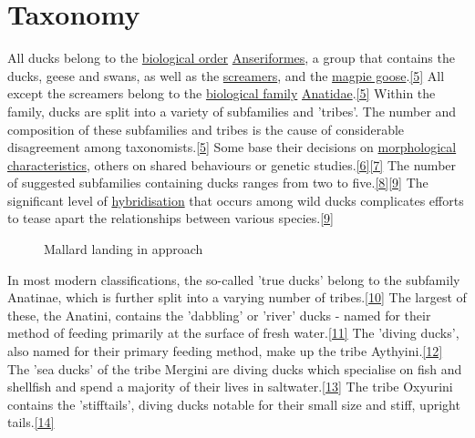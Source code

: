 \documentclass[11pt,a4paper]{article}
\begin{document}
\section{Taxonomy}

All ducks belong to the \href{/wiki/Order\_\%28biology\%29}{biological order} \href{/wiki/Anseriformes}{Anseriformes}, a group that contains the ducks, geese and swans, as well as the \href{/wiki/Screamer}{screamers}, and the \href{/wiki/Magpie\_goose}{magpie goose}.\href{\#cite\_note-FOOTNOTECarboneras1992536-5}{[5]} All except the screamers belong to the \href{/wiki/Family\_\%28biology\%29}{biological family} \href{/wiki/Anatidae}{Anatidae}.\href{\#cite\_note-FOOTNOTECarboneras1992536-5}{[5]} Within the family, ducks are split into a variety of subfamilies and 'tribes'. The number and composition of these subfamilies and tribes is the cause of considerable disagreement among taxonomists.\href{\#cite\_note-FOOTNOTECarboneras1992536-5}{[5]} Some base their decisions on \href{/wiki/Morphology\_\%28biology\%29}{morphological characteristics}, others on shared behaviours or genetic studies.\href{\#cite\_note-FOOTNOTELivezey1986737–738-6}{[6]}\href{\#cite\_note-FOOTNOTEMadsenMcHughde\_Kloet1988452-7}{[7]} The number of suggested subfamilies containing ducks ranges from two to five.\href{\#cite\_note-FOOTNOTEDonne-GousséLaudetHänni2002353–354-8}{[8]}\href{\#cite\_note-FOOTNOTECarboneras1992540-9}{[9]} The significant level of \href{/wiki/Hybrid\_\%28biology\%29}{hybridisation} that occurs among wild ducks complicates efforts to tease apart the relationships between various species.\href{\#cite\_note-FOOTNOTECarboneras1992540-9}{[9]}

\begin{figure}[h]
\caption{Mallard landing in approach}
\end{figure}

In most modern classifications, the so-called 'true ducks' belong to the subfamily Anatinae, which is further split into a varying number of tribes.\href{\#cite\_note-FOOTNOTEElphickDunningSibley2001191-10}{[10]} The largest of these, the Anatini, contains the 'dabbling' or 'river' ducks - named for their method of feeding primarily at the surface of fresh water.\href{\#cite\_note-FOOTNOTEKear2005448-11}{[11]} The 'diving ducks', also named for their primary feeding method, make up the tribe Aythyini.\href{\#cite\_note-FOOTNOTEKear2005622–623-12}{[12]} The 'sea ducks' of the tribe Mergini are diving ducks which specialise on fish and shellfish and spend a majority of their lives in saltwater.\href{\#cite\_note-FOOTNOTEKear2005686-13}{[13]} The tribe Oxyurini contains the 'stifftails', diving ducks notable for their small size and stiff, upright tails.\href{\#cite\_note-FOOTNOTEElphickDunningSibley2001193-14}{[14]}
\end{document}
